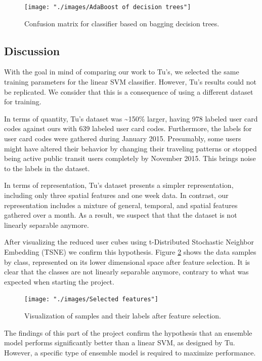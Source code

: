 \documentclass{article}
\begin{document}
\begin{figure}[H]
  \centering
  \texttt{[image: "./images/AdaBoost of decision trees"]}
  \caption{Confusion matrix for classifier based on bagging decision trees.}
  \label{fig:classification/bag_confusion}
\end{figure}


\subsection{Discussion}
With the goal in mind of comparing our work to Tu's, we selected the same training parameters for the linear SVM classifier. However, Tu's results could not be replicated. We consider that this is a consequence of using a different dataset for training. 

In terms of quantity, Tu's dataset was \textasciitilde 150\% larger, having 978 labeled user card codes against ours with 639 labeled user card codes. Furthermore, the labels for user card codes were gathered during January 2015. Presumably, some users might have altered their behavior by changing their traveling patterns or stopped being active public transit users completely by November 2015. This brings noise to the labels in the dataset.

In terms of representation, Tu's dataset presents a simpler representation, including only three spatial features and one week data. In contrast, our representation includes a mixture of general, temporal, and spatial features gathered over a month. As a result, we suspect that that the dataset is not linearly separable anymore. 

After visualizing the reduced user cubes using t-Distributed Stochastic Neighbor Embedding (TSNE) we confirm this hypothesis. Figure \ref{fig:classification/tsne} shows the data samples by class, represented on its lower dimensional space after feature selection. It is clear that the classes are not linearly separable anymore, contrary to what was expected when starting the project.

\begin{figure}[H]
  \centering
  \texttt{[image: "./images/Selected features"]}
  \caption{Visualization of samples and their labels after feature selection.}
  \label{fig:classification/tsne}
\end{figure} %

The findings of this part of the project confirm the hypothesis that an ensemble model performs significantly better than a linear SVM, as designed by Tu. However, a specific type of ensemble model is required to maximize performance. 
\end{document}
